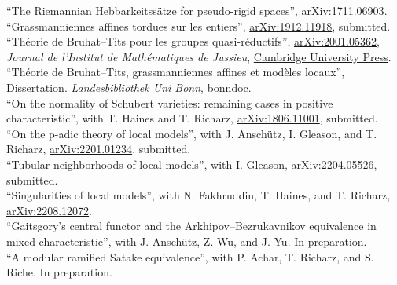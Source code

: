 \documentclass[12pt]{article} %
\begin{document}
 ``The Riemannian Hebbarkeitssätze for pseudo-rigid spaces'', \href{https://arxiv.org/abs/1711.06903}{arXiv:1711.06903}.  \\

 ``Grassmanniennes affines tordues sur les entiers'', \href{https://arxiv.org/abs/1912.11918}{arXiv:1912.11918}, submitted.\\

``Théorie de Bruhat--Tits pour les groupes quasi-réductifs'', \href{https://arxiv.org/abs/2001.05362}{arXiv:2001.05362}, \emph{Journal de l'Institut de Mathématiques de Jussieu}, \href{https://www.cambridge.org/core/journals/journal-of-the-institute-of-mathematics-of-jussieu/article/abs/theorie-de-bruhattits-pour-les-groupes-quasireductifs/324841C8B4D5E790CB9CBE984D32B13B}{Cambridge University Press}.\\

 ``Théorie de Bruhat--Tits, grassmanniennes affines et modèles locaux'', Dissertation. \emph{Landesbibliothek Uni Bonn}, \href{https://bonndoc.ulb.uni-bonn.de/xmlui/handle/20.500.11811/8641}{bonndoc}.\\

  ``On the normality of Schubert varieties: remaining cases in positive characteristic'', with T. Haines and T. Richarz, \href{https://arxiv.org/abs/1806.11001}{arXiv:1806.11001}, submitted.\\

``On the p-adic theory of local models'', with J. Anschütz, I. Gleason, and T. Richarz, \href{https://arxiv.org/abs/2201.01234}{arXiv:2201.01234}, submitted.\\

``Tubular neighborhoods of local models'', with I. Gleason, \href{https://arxiv.org/abs/2204.05526}{arXiv:2204.05526}, submitted.  \\

 ``Singularities of local models'', with N. Fakhruddin, T. Haines, and T. Richarz, \href{https://arxiv.org/abs/2208.12072}{arXiv:2208.12072}. \\


``Gaitsgory's central functor and the Arkhipov--Bezrukavnikov equivalence in mixed characteristic'', with J. Anschütz, Z. Wu, and J. Yu. In preparation. \\

``A modular ramified  Satake equivalence'', with P. Achar, T. Richarz, and S. Riche. In preparation. 
\end{document}
